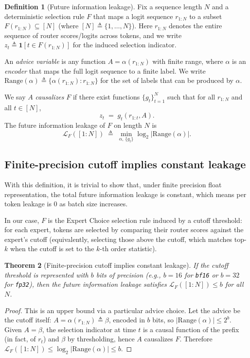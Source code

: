 \documentclass{article}
\theoremstyle{plain}
\newtheorem{theorem}{Theorem}[section]
\theoremstyle{definition}
\newtheorem{definition}[theorem]{Definition}
\theoremstyle{remark}
\begin{document}
\begin{definition}[Future information leakage]
Fix a sequence length $N$ and a deterministic selection rule $F$ that maps a logit sequence $r_{1:N}$ to a subset $F(r_{1:N}) \subseteq [N]$ (where $[N] \triangleq \{1,\dots,N\}$). Here $r_{1:N}$ denotes the entire sequence of router scores/logits across tokens, and we write $z_t \triangleq \mathbf{1}\!\left[t\in F(r_{1:N})\right]$ for the induced selection indicator.

An \emph{advice variable} is any function $A=\alpha(r_{1:N})$ with finite range, where $\alpha$ is an \emph{encoder} that maps the full logit sequence to a finite label. We write $\mathrm{Range}(\alpha)\triangleq \{\alpha(r_{1:N}) : r_{1:N}\}$ for the set of labels that can be produced by $\alpha$.

We say $A$ \emph{causalizes} $F$ if there exist functions $\{g_t\}_{t=1}^N$ such that for all $r_{1:N}$ and all $t\in[N]$,
\[
z_t \;=\; g_t\!\left(r_{1:t}, A\right).
\]
The future information leakage of $F$ on length $N$ is
\[
\mathcal{L}_F([1\!:\!N]) \;\triangleq\; \min_{\alpha,\,\{g_t\}} \log_2\!\left|\mathrm{Range}(\alpha)\right|.
\]
\end{definition}

\subsection{Finite-precision cutoff implies constant leakage}

With this definition, it is trivial to show that, under finite precision float representation, the total future information leakage is constant, which means per token leakage is 0 as batch size increases.

In our case, $F$ is the Expert Choice selection rule induced by a cutoff threshold: for each expert, tokens are selected by comparing their router scores against the expert's cutoff (equivalently, selecting those above the cutoff, which matches top-$k$ when the cutoff is set to the $k$-th order statistic).

\begin{theorem}[Finite-precision cutoff implies constant leakage]
If the cutoff threshold is represented with $b$ bits of precision (e.g., $b=16$ for \texttt{bf16} or $b=32$ for \texttt{fp32}), then the future information leakage satisfies $\mathcal{L}_F([1\!:\!N]) \le b$ for all $N$.
\end{theorem}

\begin{proof}
This is an upper bound via a particular advice choice. Let the advice be the cutoff itself: $A=\alpha(r_{1:N}) \triangleq \beta$, encoded in $b$ bits, so $|\mathrm{Range}(\alpha)| \le 2^b$. Given $A=\beta$, the selection indicator at time $t$ is a causal function of the prefix (in fact, of $r_t$) and $\beta$ by thresholding, hence $A$ causalizes $F$. Therefore $\mathcal{L}_F([1\!:\!N]) \le \log_2 |\mathrm{Range}(\alpha)| \le b$.
\end{proof}
\end{document}
